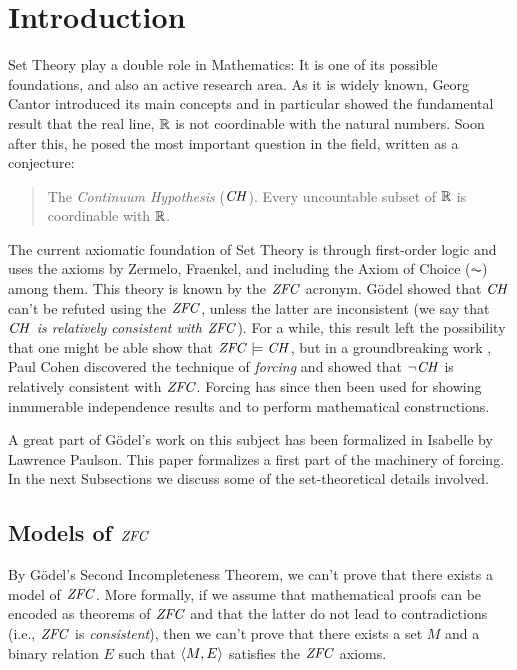 \section{Introduction}\label{sec:introduction}
Set Theory play a double role in Mathematics: It is one of its
possible foundations, and also an active research area.
%
As it is widely known, Georg Cantor introduced its main concepts and in
particular showed the fundamental result that the real line, $\mathbb{R}$  is not
coordinable with the natural numbers. Soon after this, he posed the
most important question in the field, written as a conjecture:
\begin{quote}
  The \emph{Continuum Hypothesis} ($\mathit{CH}$). Every uncountable subset of $\mathbb{R}$ is
  coordinable with $\mathbb{R}$.
\end{quote}

The current  axiomatic foundation of Set Theory is through 
first-order logic and uses the axioms by  Zermelo, Fraenkel, and
including the Axiom of Choice ($\AC$) among them. This theory is
known by the $\mathit{ZFC}$ acronym. G\"odel showed that $\mathit{CH}$ can't be
refuted using the $\mathit{ZFC}$, unless the latter are inconsistent (we say
that \emph{$\mathit{CH}$ is relatively 
  consistent with  $\mathit{ZFC}$}). For a while, this result left the
possibility that one might be able show that $\mathit{ZFC}\models \mathit{CH}$, but in
a groundbreaking work \cite{Cohen-CH-PNAS}, Paul Cohen discovered the
technique of 
\emph{forcing} and showed that $\neg\mathit{CH}$ is relatively consistent with
$\mathit{ZFC}$. Forcing has since then been used for showing innumerable
independence results and to perform mathematical constructions.

A great part of G\"odel's work on this subject has been formalized in
Isabelle by Lawrence Paulson. This paper formalizes a first part of
the machinery of forcing. In the next Subsections we discuss some of
the set-theoretical  details involved.   

\subsection{Models of $\mathit{ZFC}$}
By G\"odel's Second Incompleteness Theorem, we can't  prove that
there exists a model of $\mathit{ZFC}$. More formally, if we assume that
mathematical proofs can be encoded as theorems of $\mathit{ZFC}$ and that
the latter do not lead to contradictions (i.e., $\mathit{ZFC}$ is
\emph{consistent}), then we can't prove that there exists a set $M$
and a binary relation $E$ such that $\langle M,E\rangle$ satisfies the $\mathit{ZFC}$
axioms.

